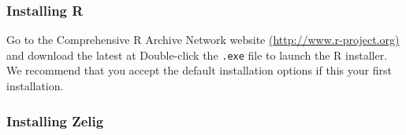 \subsubsection{Installing R}

Go to the Comprehensive R Archive Network website
\url{(http://www.r-project.org)} and download the latest
 at
Double-click the {\tt .exe} file to launch the R installer.  We recommend
that you accept the default installation options if this your first
installation.

\subsubsection{Installing Zelig}

